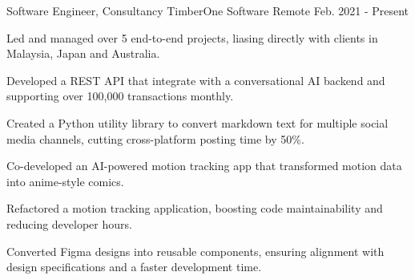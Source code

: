 

\begin{cventries}

  \cventry
    {Software Engineer, Consultancy} %
    {TimberOne Software} %
    {Remote} %
    {Feb. 2021 - Present} %
    {
      \begin{cvitems} %
        \item {Led and managed over 5 end-to-end projects, liasing directly with clients in Malaysia, Japan and Australia.}
        \item {Developed a REST API that integrate with a conversational AI backend and supporting over 100,000 transactions monthly.}
        \item {Created a Python utility library to convert markdown text for multiple social media channels, cutting cross-platform posting time by 50\%.}
        \item {Co-developed an AI-powered motion tracking app that transformed motion data into anime-style comics.}
        \item {Refactored a motion tracking application, boosting code maintainability and reducing developer hours.}
        \item {Converted Figma designs into reusable components, ensuring alignment with design specifications and a faster development time.}
      \end{cvitems}
    }


\end{cventries}
